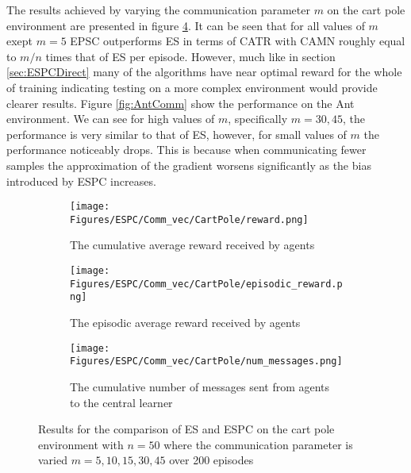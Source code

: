 The results achieved by varying the communication parameter $m$ on the cart pole environment are presented in figure \ref{fig:CPComm}. It can be seen that for all values of $m$ exept $m=5$ EPSC outperforms ES in terms of CATR with CAMN roughly equal to $m/n$ times that of ES per episode. However, much like in section \ref{sec:ESPCDirect} many of the algorithms have near optimal reward for the whole of training indicating testing on a more complex environment would provide clearer results. Figure \ref{fig:AntComm} show the performance on the Ant environment. We can see for high values of $m$, specifically $m=30,45$, the performance is very similar to that of ES, however, for small values of $m$ the performance noticeably drops. This is because when communicating fewer samples the approximation of the gradient worsens significantly as the bias introduced by ESPC increases.
\begin{figure}
    \centering
    \begin{subfigure}{0.5\textwidth}
        \centering
        \texttt{[image: Figures/ESPC/Comm\_vec/CartPole/reward.png]}
        \caption{The cumulative average reward received by agents}
        \label{fig:CommReward}
    \end{subfigure}
    \begin{subfigure}{0.5\textwidth}
        \centering
        \texttt{[image: Figures/ESPC/Comm\_vec/CartPole/episodic\_reward.png]}
        \caption{The episodic average reward received by agents}
        \label{fig:CommEpisodicReward}
    \end{subfigure}
    \begin{subfigure}{0.5\textwidth}
        \centering
        \texttt{[image: Figures/ESPC/Comm\_vec/CartPole/num\_messages.png]}
        \caption{The cumulative number of messages sent from agents to the central learner}
        \label{fig:CommMessages}
    \end{subfigure}
    \caption{Results for the comparison of ES and ESPC on the cart pole environment with $n=50$ where the communication parameter is varied $m=5,10,15,30,45$ over 200 episodes}
    \label{fig:CPComm}
\end{figure}
